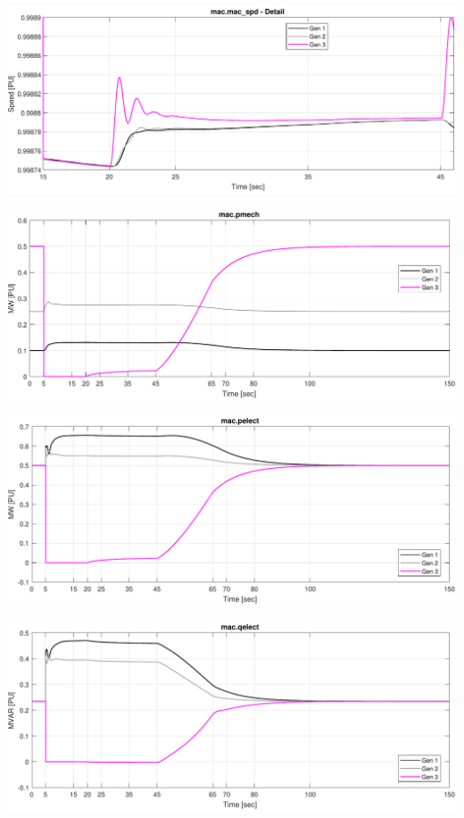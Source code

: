 \includegraphics[width=\linewidth]{examples/untrip/combinedSpeedDetail}

\includegraphics[width=\linewidth]{examples/untrip/combinedPmech}

\includegraphics[width=\linewidth]{examples/untrip/combinedPelect}

\includegraphics[width=\linewidth]{examples/untrip/combinedQelect}

